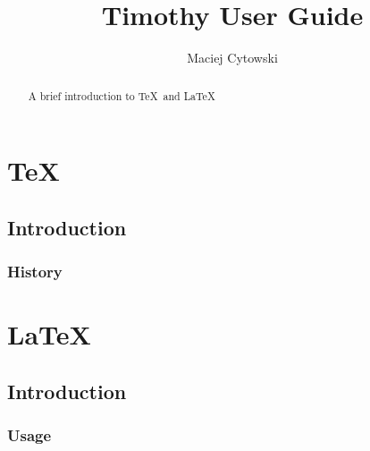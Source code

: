 \documentclass[]{report}   %
\begin{document}
\title{Timothy User Guide}   %
\author{Maciej Cytowski}         %
\maketitle

\begin{abstract}
  A brief introduction to \TeX\ and \LaTeX
\end{abstract}

\chapter{\TeX}             %
\section{Introduction}     %
\subsection{History}       %

\chapter{\LaTeX}           %
\section{Introduction}     %
\subsection{Usage}         %

\begin{thebibliography}{9}
\end{thebibliography}
\end{document}
